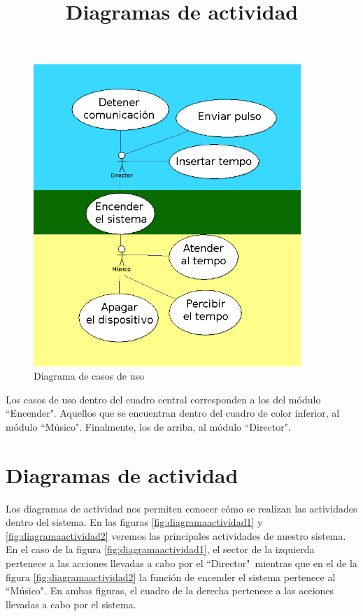 \begin{figure}[!htb]
\centering
\includegraphics[width=0.9\textwidth]{./imagenes/diagramacasosuso}
\caption{Diagrama de casos de uso} \label{fig:diagramacasosdeuso}
\end{figure}

Los casos de uso dentro del cuadro central corresponden a los del módulo ``Encender".
Aquellos que se encuentran dentro del cuadro de color inferior, al módulo ``Músico". Finalmente,
los de arriba, al módulo ``Director".\\

\section{Diagramas de actividad}
\title{Diagramas de actividad}

Los diagramas de actividad nos permiten conocer cómo se realizan
las actividades dentro del sistema. En las figuras \ref{fig:diagramaactividad1} y \ref{fig:diagramaactividad2}
veremos las principales actividades de nuestro sistema. En el caso de la figura \ref{fig:diagramaactividad1},
el sector de la izquierda pertenece a las acciones llevadas a cabo por el ``Director"\ mientras que en el de la figura
\ref{fig:diagramaactividad2} la función de encender el sistema pertenece al ``Músico". En ambas
figuras, el cuadro de la derecha pertenece a las acciones llevadas a cabo por el sistema.\\

